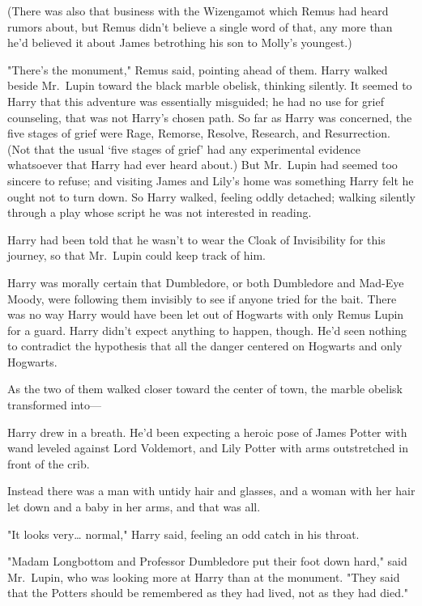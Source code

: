 (There was also that business with the Wizengamot which Remus had heard rumors 
about, but Remus didn't believe a single word of that, any more than he'd 
believed it about James betrothing his son to Molly's youngest.)

"There's the monument," Remus said, pointing ahead of them.
\sbreak
Harry walked beside Mr.~Lupin toward the black marble obelisk, thinking 
silently. It seemed to Harry that this adventure was essentially misguided; he 
had no use for grief counseling, that was not Harry's chosen path. So far as 
Harry was concerned, the five stages of grief were Rage, Remorse, Resolve, 
Research, and Resurrection. (Not that the usual `five stages of grief' had any 
experimental evidence whatsoever that Harry had ever heard about.) But 
Mr.~Lupin had seemed too sincere to refuse; and visiting James and Lily's home 
was something Harry felt he ought not to turn down. So Harry walked, feeling 
oddly detached; walking silently through a play whose script he was not 
interested in reading.

Harry had been told that he wasn't to wear the Cloak of Invisibility for this 
journey, so that Mr.~Lupin could keep track of him.

Harry was morally certain that Dumbledore, or both Dumbledore and Mad-Eye 
Moody, were following them invisibly to see if anyone tried for the bait. There 
was no way Harry would have been let out of Hogwarts with only Remus Lupin for 
a guard. Harry didn't expect anything to happen, though. He'd seen nothing to 
contradict the hypothesis that all the danger centered on Hogwarts and only 
Hogwarts.

As the two of them walked closer toward the center of town, the marble obelisk 
transformed into---

Harry drew in a breath. He'd been expecting a heroic pose of James Potter with 
wand leveled against Lord Voldemort, and Lily Potter with arms outstretched in 
front of the crib.

Instead there was a man with untidy hair and glasses, and a woman with her hair 
let down and a baby in her arms, and that was all.

"It looks very{\ldots} normal," Harry said, feeling an odd catch in his throat.

"Madam Longbottom and Professor Dumbledore put their foot down hard," said 
Mr.~Lupin, who was looking more at Harry than at the monument. "They said that 
the Potters should be remembered as they had lived, not as they had died."


